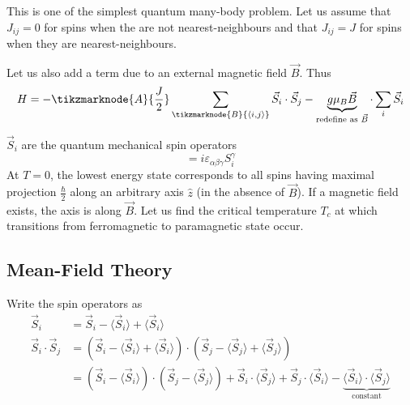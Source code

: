 \documentclass[12pt,a4paper,titlepage]{article}
\newcommand{\trm}[1]{\textrm{#1}} %
\begin{document}
This is one of the simplest quantum many-body problem. Let us assume that $J_{ij}=0$ for spins when the are not nearest-neighbours and that $J_{ij}=J$ for spins when they are nearest-neighbours. 
\begin{center}
\end{center}
Let us also add a term due to an external magnetic field $\vec{B}$. Thus
\begin{equation}
H=-\tikzmarknode{A}{\frac{J}{2}}\sum_{\tikzmarknode{B}{\langle i,j\rangle}}\vec{S}_{i}\cdot\vec{S}_{j}-\underbrace{g\mu_{B}\vec{B}}_{\trm{redefine as $\vec{B}$}}\cdot\sum_{i}\vec{S}_{i}
\end{equation}
$\vec{S}_{i}$ are the quantum mechanical spin operators
\begin{equation}
[S_{i}^{\alpha},S_{i}^{\beta}]=i\varepsilon_{\alpha\beta\gamma}S_{i}^{\gamma}
\end{equation}
At $T=0$, the lowest energy state corresponds to all spins having maximal projection $\frac{\hbar}{2}$ along an arbitrary axis $\hat{z}$ (in the absence of $\vec{B}$). If a magnetic field exists, the axis is along $\vec{B}$. Let us find the critical temperature $T_{c}$ at which transitions from ferromagnetic to paramagnetic state occur.

\subsection{Mean-Field Theory}
Write the spin operators as
\begin{equation}
\begin{aligned}
\vec{S}_{i}&=\vec{S}_{i}-\langle \vec{S}_{i}\rangle+\langle \vec{S}_{i}\rangle\\
\vec{S}_{i}\cdot\vec{S}_{j}&=\left(\vec{S}_{i}-\langle\vec{S}_{i}\rangle+\langle\vec{S}_{i}\rangle\right)\cdot\left(\vec{S}_{j}-\langle\vec{S}_{j}\rangle+\langle\vec{S}_{j}\rangle\right)\\
&=\left(\vec{S}_{i}-\langle\vec{S}_{i}\rangle\right)\cdot\left(\vec{S}_{j}-\langle\vec{S}_{j}\rangle\right)+\vec{S}_{i}\cdot\langle\vec{S}_{j}\rangle+\vec{S}_{j}\cdot\langle\vec{S}_{i}\rangle-\underbrace{\langle\vec{S}_{i}\rangle\cdot\langle\vec{S}_{j}\rangle}_{\trm{constant}}
\end{aligned}
\end{equation}
\end{document}
